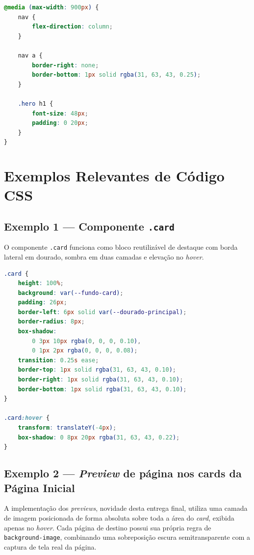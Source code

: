 \documentclass[12pt,a4paper]{article}
\begin{document}
\begin{lstlisting}[language=CSS, caption={Media query global em telas menores}]
@media (max-width: 900px) {
    nav {
        flex-direction: column;
    }

    nav a {
        border-right: none;
        border-bottom: 1px solid rgba(31, 63, 43, 0.25);
    }

    .hero h1 {
        font-size: 48px;
        padding: 0 20px;
    }
}
\end{lstlisting}

\section{Exemplos Relevantes de Código CSS}

\subsection{Exemplo 1 — Componente \texttt{.card}}

O componente \texttt{.card} funciona como bloco reutilizável de destaque com borda lateral em
dourado, sombra em duas camadas e elevação no \textit{hover}.

\begin{lstlisting}[language=CSS, caption={Componente card}]
.card {
    height: 100%;
    background: var(--fundo-card);
    padding: 26px;
    border-left: 6px solid var(--dourado-principal);
    border-radius: 8px;
    box-shadow:
        0 3px 10px rgba(0, 0, 0, 0.10),
        0 1px 2px rgba(0, 0, 0, 0.08);
    transition: 0.25s ease;
    border-top: 1px solid rgba(31, 63, 43, 0.10);
    border-right: 1px solid rgba(31, 63, 43, 0.10);
    border-bottom: 1px solid rgba(31, 63, 43, 0.10);
}

.card:hover {
    transform: translateY(-4px);
    box-shadow: 0 8px 20px rgba(31, 63, 43, 0.22);
}
\end{lstlisting}

\subsection{Exemplo 2 — \textit{Preview} de página nos cards da Página Inicial}

A implementação dos \textit{previews}, novidade desta entrega final, utiliza uma camada de
imagem posicionada de forma absoluta sobre toda a área do \textit{card}, exibida apenas no
\textit{hover}. Cada página de destino possui sua própria regra de \texttt{background-image},
combinando uma sobreposição escura semitransparente com a captura de tela real da página.
\end{document}
